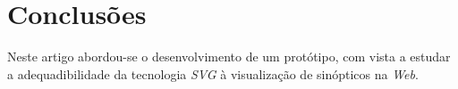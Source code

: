 \documentclass[twocolumn,twoside,11pt]{article}
\newcommand{\class}[1]{{\normalfont\slshape #1\/}}
\newcommand{\svg}{\class{SVG}}
\begin{document}
\lipsum[7]



\section{Conclusões}\label{sec:conclusions}

Neste artigo abordou-se o desenvolvimento de um protótipo, com vista a
estudar a adequadibilidade da tecnologia \svg{} à visualização de
sinópticos na \textit{Web}.

\lipsum[8]


\renewcommand{\bibname}{Referências}
%
%

%


\end{document}
